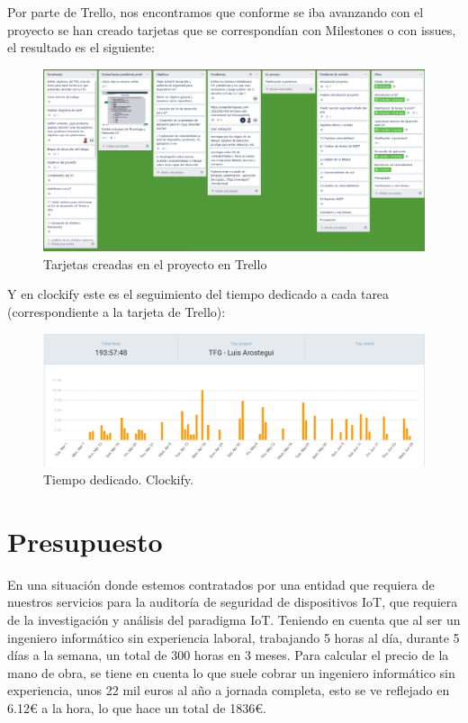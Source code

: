\newpage

Por parte de Trello, nos encontramos que conforme se iba avanzando con el proyecto se han creado tarjetas que se correspondían con Milestones o con issues, el resultado es el siguiente:

\begin{figure}[hb!]
    \centering
    \includegraphics[width=\linewidth]{imagenes/trello.png}
    \caption{Tarjetas creadas en el proyecto en Trello}
    \label{fig:figure7-plan}
\end{figure}

\newpage

Y en clockify este es el seguimiento del tiempo dedicado a cada tarea (correspondiente a la tarjeta de Trello):


\begin{figure}[hb!]
    \centering
    \includegraphics[width=\linewidth]{imagenes/clockify.png}
    \caption{Tiempo dedicado. Clockify.}
    \label{fig:figure8-plan}
\end{figure}




\chapter{Presupuesto}

En una situación donde estemos contratados por una entidad que requiera de nuestros servicios para la auditoría de seguridad de dispositivos IoT, que requiera de la investigación y análisis del paradigma IoT. Teniendo en cuenta que al ser un ingeniero informático sin experiencia laboral, trabajando 5 horas al día, durante 5 días a la semana, un total de 300 horas en 3 meses. Para calcular el precio de la mano de obra, se tiene en cuenta lo que suele cobrar un ingeniero informático sin experiencia, unos 22 mil euros al año a jornada completa, esto se ve reflejado en 6.12€ a la hora, lo que hace un total de 1836€. \\

